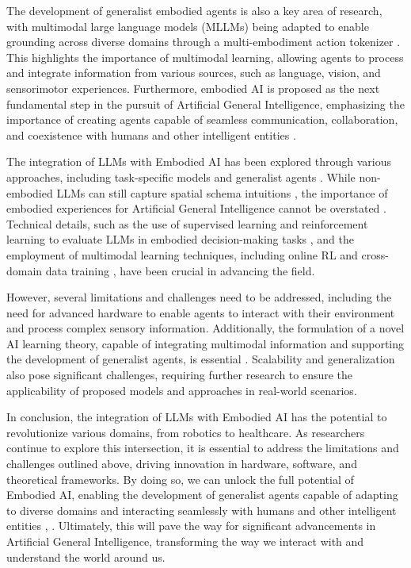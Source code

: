 \documentclass[conference]{IEEEtran}
\begin{document}
The development of generalist embodied agents is also a key area of research, with multimodal large language models (MLLMs) being adapted to enable grounding across diverse domains through a multi-embodiment action tokenizer \cite{b4}. This highlights the importance of multimodal learning, allowing agents to process and integrate information from various sources, such as language, vision, and sensorimotor experiences. Furthermore, embodied AI is proposed as the next fundamental step in the pursuit of Artificial General Intelligence, emphasizing the importance of creating agents capable of seamless communication, collaboration, and coexistence with humans and other intelligent entities \cite{b5}.

The integration of LLMs with Embodied AI has been explored through various approaches, including task-specific models \cite{b1} and generalist agents \cite{b4}. While non-embodied LLMs can still capture spatial schema intuitions \cite{b2}, the importance of embodied experiences for Artificial General Intelligence cannot be overstated \cite{b5}. Technical details, such as the use of supervised learning and reinforcement learning to evaluate LLMs in embodied decision-making tasks \cite{b1}, and the employment of multimodal learning techniques, including online RL and cross-domain data training \cite{b4}, have been crucial in advancing the field.

However, several limitations and challenges need to be addressed, including the need for advanced hardware to enable agents to interact with their environment and process complex sensory information. Additionally, the formulation of a novel AI learning theory, capable of integrating multimodal information and supporting the development of generalist agents, is essential \cite{b5}. Scalability and generalization also pose significant challenges, requiring further research to ensure the applicability of proposed models and approaches in real-world scenarios.

In conclusion, the integration of LLMs with Embodied AI has the potential to revolutionize various domains, from robotics to healthcare. As researchers continue to explore this intersection, it is essential to address the limitations and challenges outlined above, driving innovation in hardware, software, and theoretical frameworks. By doing so, we can unlock the full potential of Embodied AI, enabling the development of generalist agents capable of adapting to diverse domains and interacting seamlessly with humans and other intelligent entities \cite{b4}, \cite{b5}. Ultimately, this will pave the way for significant advancements in Artificial General Intelligence, transforming the way we interact with and understand the world around us.
\end{document}
